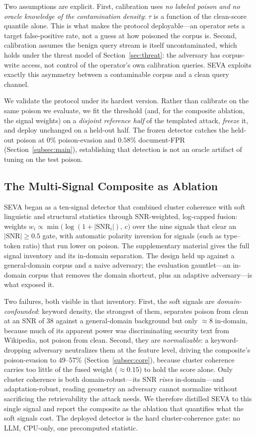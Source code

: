\documentclass[10pt,journal,compsoc]{IEEEtran}
\begin{document}
Two assumptions are explicit. First, calibration uses \emph{no labeled poison and
no oracle knowledge of the contamination density}: $\tau$ is a function of the
clean-score quantile alone. This is what makes the protocol deployable---an operator
sets a target false-positive rate, not a guess at how poisoned the corpus is.
Second, calibration assumes the benign query stream is itself uncontaminated, which
holds under the threat model of Section~\ref{sec:threat}: the adversary has
corpus-write access, not control of the operator's own calibration queries. SEVA
exploits exactly this asymmetry between a contaminable corpus and a clean query
channel.

We validate the protocol under its hardest version. Rather than calibrate on the
same poison we evaluate, we fit the threshold (and, for the composite ablation, the
signal weights) on a \emph{disjoint reference half} of the templated attack,
\emph{freeze} it, and deploy unchanged on a held-out half. The frozen detector
catches the held-out poison at $0\%$ poison-evasion and $0.58\%$ document-FPR
(Section~\ref{subsec:main}), establishing that detection is not an oracle artifact
of tuning on the test poison.

\subsection{The Multi-Signal Composite as Ablation}
SEVA began as a ten-signal detector that combined cluster coherence with soft
linguistic and structural statistics through SNR-weighted, log-capped fusion:
weights $w_i \propto \min\!\big(\log(1+|\mathrm{SNR}_i|),\,c\big)$ over the nine
signals that clear an $|\mathrm{SNR}|\geq0.5$ gate, with automatic polarity
inversion for signals (such as type--token ratio) that run lower on poison.
The supplementary material gives the full signal inventory and its in-domain separation. The
design held up against a general-domain corpus and a naive adversary; the
evaluation gauntlet---an in-domain corpus that removes the domain shortcut, plus an
adaptive adversary---is what exposed it.

Two failures, both visible in that inventory. First, the soft signals are
\emph{domain-confounded}: keyword density, the strongest of them, separates poison
from clean at an SNR of $38$ against a general-domain background but only
$\approx\!8$ in-domain, because much of its apparent power was discriminating
security text from Wikipedia, not poison from clean.
Second, they are \emph{normalizable}: a keyword-dropping adversary neutralizes them
at the feature level, driving the composite's poison-evasion to $49$--$57\%$
(Section~\ref{subsec:core}), because cluster coherence carries too little of the
fused weight ($\approx\!0.15$) to hold the score alone.
Only cluster coherence is both domain-robust---its SNR \emph{rises} in-domain---and
adaptation-robust, reading geometry an adversary cannot normalize without
sacrificing the retrievability the attack needs. We therefore distilled SEVA to
this single signal and report the composite as the ablation that quantifies what
the soft signals cost. The deployed detector is the hard cluster-coherence gate: no
LLM, CPU-only, one precomputed statistic.
\end{document}
